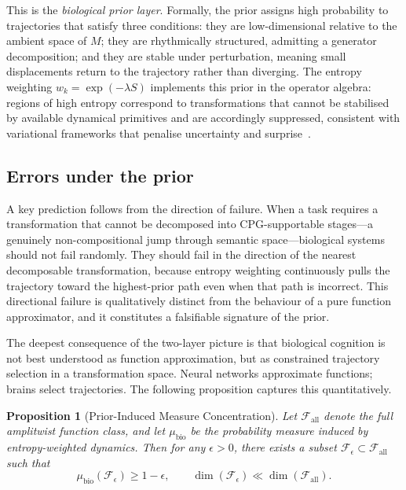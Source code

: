 \documentclass[12pt, a4paper]{article}
\newtheorem{proposition}[theorem]{Proposition}
\theoremstyle{remark}
\theoremstyle{definition}
\begin{document}
This is the \emph{biological prior layer}.  Formally, the prior assigns high probability
to trajectories that satisfy three conditions: they are low-dimensional relative to the
ambient space of $M$; they are rhythmically structured, admitting a generator
decomposition; and they are stable under perturbation, meaning small displacements return
to the trajectory rather than diverging.  The entropy weighting $w_k = \exp(-\lambda S)$
implements this prior in the operator algebra: regions of high entropy correspond to
transformations that cannot be stabilised by available dynamical primitives and are
accordingly suppressed, consistent with variational frameworks that penalise uncertainty and surprise~\cite{friston2010free}.

\subsection{Errors under the prior}

A key prediction follows from the direction of failure.  When a task requires a
transformation that cannot be decomposed into CPG-supportable stages---a genuinely
non-compositional jump through semantic space---biological systems should not fail randomly.
They should fail in the direction of the nearest decomposable transformation, because
entropy weighting continuously pulls the trajectory toward the highest-prior path even when
that path is incorrect.  This directional failure is qualitatively distinct from the
behaviour of a pure function approximator, and it constitutes a falsifiable signature of
the prior.

The deepest consequence of the two-layer picture is that biological cognition is not best
understood as function approximation, but as constrained trajectory selection in a
transformation space.  Neural networks approximate functions; brains select trajectories.
The following proposition captures this quantitatively.

\begin{proposition}[Prior-Induced Measure Concentration]
\label{prop:concentration}
Let $\mathcal{F}_{\mathrm{all}}$ denote the full amplitwist function class, and let
$\mu_{\mathrm{bio}}$ be the probability measure induced by entropy-weighted dynamics.
Then for any $\epsilon > 0$, there exists a subset $\mathcal{F}_\epsilon \subset
\mathcal{F}_{\mathrm{all}}$ such that
\[
\mu_{\mathrm{bio}}(\mathcal{F}_\epsilon) \ge 1 - \epsilon,
\qquad
\dim(\mathcal{F}_\epsilon) \ll \dim(\mathcal{F}_{\mathrm{all}}).
\]
\end{proposition}
\end{document}
